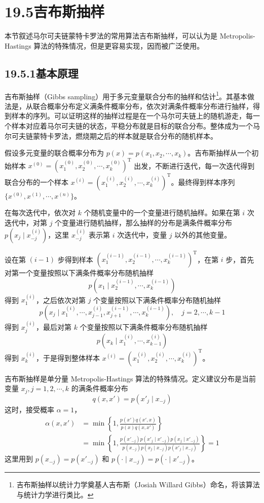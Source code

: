 \documentclass[UTF8,12pt,a4paper,fontset=fandol]{ctexart}
\begin{document}
\section*{19.5\quad 吉布斯抽样}

本节叙述马尔可夫链蒙特卡罗法的常用算法吉布斯抽样，可以认为是 Metropolis-Hastings 算法的特殊情况，但是更容易实现，因而被广泛使用。

\subsection*{19.5.1\quad 基本原理}

吉布斯抽样（Gibbs sampling）用于多元变量联合分布的抽样和估计\footnote{吉布斯抽样以统计力学奠基人吉布斯（Josiah Willard Gibbs）命名，将该算法与统计力学进行类比。}。其基本做法是，从联合概率分布定义满条件概率分布，依次对满条件概率分布进行抽样，得到样本的序列。可以证明这样的抽样过程是在一个马尔可夫链上的随机游走，每一个样本对应着马尔可夫链的状态，平稳分布就是目标的联合分布。整体成为一个马尔可夫链蒙特卡罗法，燃烧期之后的样本就是联合分布的随机样本。

假设多元变量的联合概率分布为 $p(x)=p(x_1,x_2,\cdots,x_k)$。吉布斯抽样从一个初始样本 $x^{(0)}=(x_1^{(0)},x_2^{(0)},\cdots,x_k^{(0)})^{\mathrm{T}}$ 出发，不断进行迭代，每一次迭代得到联合分布的一个样本 $x^{(i)}=(x_1^{(i)},x_2^{(i)},\cdots,x_k^{(i)})^{\mathrm{T}}$。最终得到样本序列 $\{x^{(0)},x^{(1)},\cdots,x^{(n)}\}$。

在每次迭代中，依次对 $k$ 个随机变量中的一个变量进行随机抽样。如果在第 $i$ 次迭代中，对第 $j$ 个变量进行随机抽样，那么抽样的分布是满条件概率分布 $p(x_j\mid x_{-j}^{(i)})$，这里 $x_{-j}^{(i)}$ 表示第 $i$ 次迭代中，变量 $j$ 以外的其他变量。

设在第 $(i-1)$ 步得到样本 $(x_1^{(i-1)},x_2^{(i-1)},\cdots,x_k^{(i-1)})^{\mathrm{T}}$，在第 $i$ 步，首先对第一个变量按照以下满条件概率分布随机抽样
\[
p(x_1\mid x_2^{(i-1)},\cdots,x_k^{(i-1)})
\]
得到 $x_1^{(i)}$，之后依次对第 $j$ 个变量按照以下满条件概率分布随机抽样
\[
p(x_j\mid x_1^{(i)},\cdots,x_{j-1}^{(i)},x_{j+1}^{(i-1)},\cdots,x_k^{(i-1)}),\quad j=2,\cdots,k-1
\]
得到 $x_j^{(i)}$，最后对第 $k$ 个变量按照以下满条件概率分布随机抽样
\[
p(x_k\mid x_1^{(i)},\cdots,x_{k-1}^{(i)})
\]
得到 $x_k^{(i)}$，于是得到整体样本 $x^{(i)}=(x_1^{(i)},x_2^{(i)},\cdots,x_k^{(i)})^{\mathrm{T}}$。

吉布斯抽样是单分量 Metropolis-Hastings 算法的特殊情况。定义建议分布是当前变量 $x_j,j=1,2,\cdots,k$ 的满条件概率分布
\begin{equation}
q(x,x')=p(x'_j\mid x_{-j})
\tag{19.49}
\end{equation}
这时，接受概率 $\alpha=1$，
\begin{equation}
\begin{aligned}
\alpha(x,x')&=\min\left\{1,\frac{p(x')q(x',x)}{p(x)q(x,x')}\right\}\\
&=\min\left\{1,\frac{p(x'_{-j})p(x'_j\mid x'_{-j})p(x_j\mid x'_{-j})}{p(x_{-j})p(x_j\mid x_{-j})p(x'_j\mid x_{-j})}\right\}=1
\end{aligned}
\tag{19.50}
\end{equation}
这里用到 $p(x_{-j})=p(x'_{-j})$ 和 $p(\cdot\mid x_{-j})=p(\cdot\mid x'_{-j})$。
\end{document}
